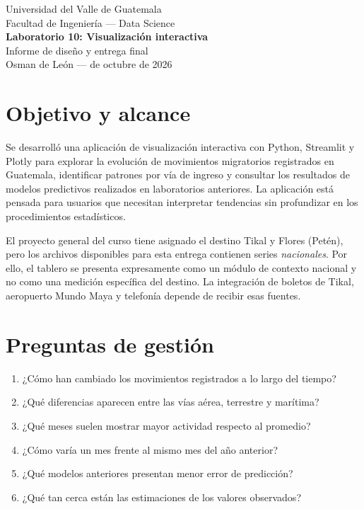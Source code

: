 \documentclass[11pt,letterpaper]{article}
\begin{document}
\begin{center}
{\small Universidad del Valle de Guatemala\\Facultad de Ingeniería --- Data Science}\\[7pt]
{\Large\bfseries Laboratorio 10: Visualización interactiva}\\[4pt]
{\normalsize Informe de diseño y entrega final}\\[8pt]
Osman de León \quad ---  de octubre de 2026
\end{center}

\section{Objetivo y alcance}
Se desarrolló una aplicación de visualización interactiva con Python, Streamlit y Plotly para explorar la evolución de movimientos migratorios registrados en Guatemala, identificar patrones por vía de ingreso y consultar los resultados de modelos predictivos realizados en laboratorios anteriores. La aplicación está pensada para usuarios que necesitan interpretar tendencias sin profundizar en los procedimientos estadísticos.

El proyecto general del curso tiene asignado el destino Tikal y Flores (Petén), pero los archivos disponibles para esta entrega contienen series \emph{nacionales}. Por ello, el tablero se presenta expresamente como un módulo de contexto nacional y no como una medición específica del destino. La integración de boletos de Tikal, aeropuerto Mundo Maya y telefonía depende de recibir esas fuentes.

\section{Preguntas de gestión}
\begin{enumerate}
\item ¿Cómo han cambiado los movimientos registrados a lo largo del tiempo?
\item ¿Qué diferencias aparecen entre las vías aérea, terrestre y marítima?
\item ¿Qué meses suelen mostrar mayor actividad respecto al promedio?
\item ¿Cómo varía un mes frente al mismo mes del año anterior?
\item ¿Qué modelos anteriores presentan menor error de predicción?
\item ¿Qué tan cerca están las estimaciones de los valores observados?
\end{enumerate}
\end{document}
